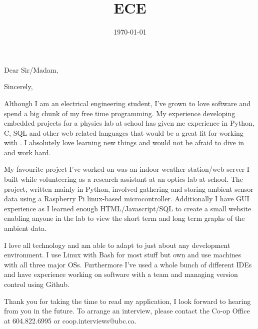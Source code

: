 \documentclass[11pt,a4paper,sans]{moderncv}        %
\title{ECE}                               %
\begin{document}



\date{\today}
\opening{Dear Sir/Madam,}
\closing{Sincerely,}
\makelettertitle


Although I am an electrical engineering student, I’ve grown to love software and spend a big chunk of my free time programming.  My experience developing embedded projects for a physics lab at school has given me experience in Python, C, SQL and other web related languages that would be a great fit for working with \field. I absolutely love learning new things and would not be afraid to dive in and work hard. 

My favourite project I’ve worked on was an indoor weather station/web server I built while volunteering as a research assistant at an optics lab at school. The project, written mainly in Python, involved gathering and storing ambient sensor data using a Raspberry Pi linux-based microcontroller. Additionally I have GUI experience as I learned enough HTML/Javascript/SQL to create a small website enabling anyone in the lab to view the short term and long term graphs of the ambient data.

I love all technology and am able to adapt to just about any development environment. I use Linux with Bash for most stuff but own and use machines with all three major OSs. Furthermore I’ve used a whole bunch of different IDEs and have experience working on software with a team and managing version control using Github.

Thank you for taking the time to read my application, I look forward to hearing from you in the future. To arrange an interview, please contact the Co-op Office at 604.822.6995 or coop.interviews@ubc.ca.

\makeletterclosing
\end{document}
